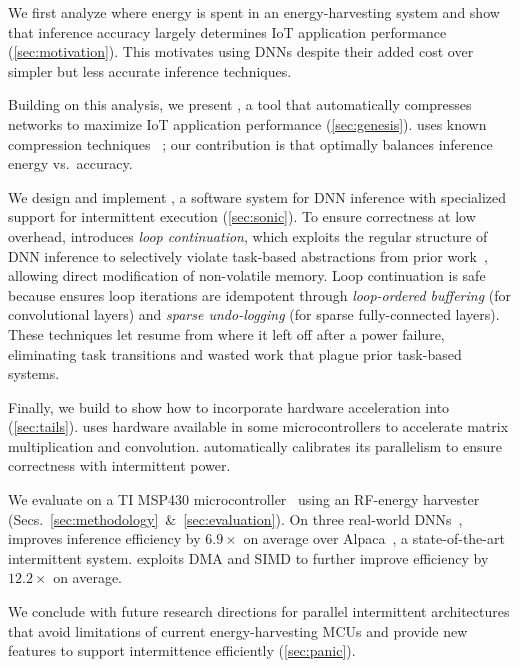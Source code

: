 \begin{compactitem}
\item We first analyze where energy is spent in an energy-harvesting system
and show that inference accuracy largely determines IoT
application performance (\autoref{sec:motivation}).
%
This motivates using DNNs despite their added cost over simpler but
less accurate inference techniques.
%
\item Building on this analysis, we present \genesis, a tool that
automatically compresses networks to maximize IoT application
performance (\autoref{sec:genesis}).
%
\genesis uses known compression techniques%
~\cite{nabhan1994toward, han:iclr16:deep-compression,
  chollet2016xception, bhattacharya2016sparsification};
%
our contribution is that \genesis optimally balances inference energy
vs.\ accuracy. %
%
\item We design and implement \sonic, 
  a software system for DNN inference with specialized support for intermittent execution
  (\autoref{sec:sonic}).
  To ensure correctness at low overhead,
  \sonic introduces \emph{loop continuation},
  which exploits the regular structure of DNN inference
  to selectively violate task-based abstractions from prior work~\cite{alpaca},
  allowing direct modification of non-volatile memory.
%
  Loop continuation is safe because
  \sonic ensures loop iterations are idempotent
  through \emph{loop-ordered buffering} (for convolutional layers) and \emph{sparse undo-logging} (for sparse fully-connected layers).
%
These techniques let \sonic resume from where it left off after a power failure,
{eliminating task transitions and wasted work} that plague prior task-based systems.
%
\item Finally, we build \tails to show how to incorporate hardware
  acceleration into \sonic (\autoref{sec:tails}). \tails uses
  hardware available in some microcontrollers to accelerate matrix
  multiplication and convolution.
  \tails automatically calibrates its parallelism
  to ensure correctness with intermittent power.

\end{compactitem}

\noindent
We evaluate \sonictails on a TI MSP430
microcontroller~\cite{msp430fr5994} using an RF-energy
harvester~\cite{powercastboard,powercasttransmitter} (Secs.~\ref{sec:methodology}~\&~\ref{sec:evaluation}).
%
On three real-world DNNs~\cite{lecun:ieee89:lenet,okgoogle,har},
\sonic improves inference efficiency by $6.9\times$ on average
over Alpaca~\cite{alpaca}, a state-of-the-art intermittent system.
%
\tails exploits DMA and SIMD to further improve efficiency by $12.2\times$ on average.

We conclude with future research directions for parallel intermittent architectures
that avoid limitations of current energy-harvesting MCUs
and provide new features to support intermittence efficiently
(\autoref{sec:panic}).


